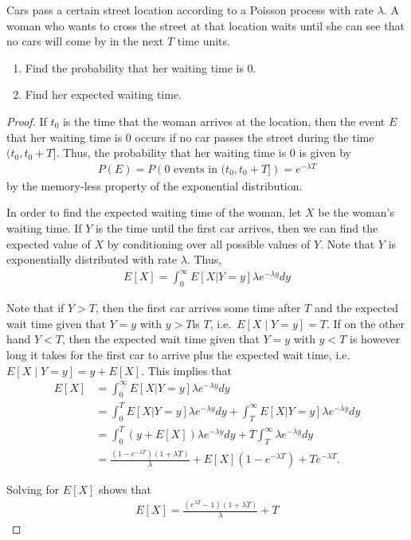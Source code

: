 \begin{problem}{5.44}
  Cars pass a certain street location according to a Poisson process with rate $\lambda$.
  A woman who wants to cross the street at that location waits until she can see that
  no cars will come by in the next $T$ time units.
  \begin{enumerate}
    \item Find the probability that her waiting time is 0.
    \item Find her expected waiting time.
  \end{enumerate}
\end{problem}

\begin{proof}
  If $t_0$ is the time that the woman arrives at the location, then the event $E$
  that her waiting time is 0 occurs if no car passes the street during the time $(t_0, t_0 + T]$.
  Thus, the probability that her waiting time is 0 is given by
  \begin{align*}
    P(E) = P(0 \text{ events in $(t_0, t_0+T]$}) = e^{-\lambda T}
  \end{align*}
  by the memory-less property of the exponential distribution.

  In order to find the expected waiting time of the woman, let $X$ be the woman's waiting time.
  If $Y$ is the time until the first car arrives, then we can find the expected value
  of $X$ by conditioning over all possible values of $Y$. Note that $Y$ is exponentially
  distributed with rate $\lambda$. Thus,
  \begin{align*}
    E[X] = \int_0^\infty E[X | Y = y] \lambda e^{-\lambda y} dy
  \end{align*}

  Note that if $Y > T$, then the first car arrives some time
  after $T$ and the expected wait time given that $Y=y$ with $y > T$is $T$, i.e.\  $E[X \mid Y = y] = T$.
  If on the other hand $Y < T$, then the expected wait time given that $Y =y$ with $y < T$
  is however long it takes for
  the first car to arrive plus the expected wait time, i.e.\ $E[X \mid Y=y] = y + E[X]$.
  This implies that
  \begin{align*}
    E[X] &= \int_0^\infty E[X | Y = y] \lambda e^{-\lambda y} dy \\
    &= \int_0^T E[X | Y = y] \lambda e^{-\lambda y} dy + \int_T^\infty E[X | Y = y] \lambda e^{-\lambda y} dy \\
    &= \int_0^T (y + E[X]) \lambda e^{-\lambda y} dy + T \int_T^\infty  \lambda e^{-\lambda y} dy \\
    &= \frac{(1 - e^{-\lambda T})(1 + \lambda T)}{\lambda} + E[X](1 - e^{-\lambda T}) + T e^{-\lambda T}.
  \end{align*}

  Solving for $E[X]$ shows that
  \begin{align*}
    E[X] = \frac{(e^{\lambda T} - 1)(1+\lambda T)}{\lambda} + T
  \end{align*}

\end{proof}
\newpage

